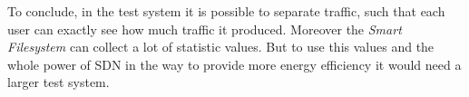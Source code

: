 To conclude, in the test system it is possible to separate traffic, such that each user can exactly see how much traffic it produced. Moreover the \textit{Smart Filesystem} can collect a lot of statistic values. But to use this values and the whole power of SDN in the way to provide more energy efficiency it would need a larger test system.  

